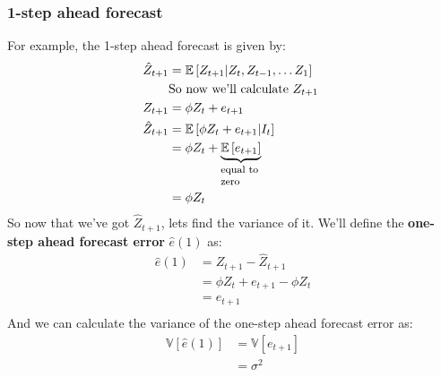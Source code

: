 \subsubsection{1-step ahead forecast}
For example, the 1-step ahead forecast is given by:
\begin{equation*}
    \begin{aligned}
        \hat{Z}_{t+1} &= \mathbb{E}\left[Z_{t+1} | Z_{t}, Z_{t-1}, \dots
        Z_{1}\right]  \\
                      &\text{So now we'll calculate $Z_{t+1}$ }\\
            Z_{t+1} &= \phi Z_{t} + e_{t+1} \\
        \hat{Z}_{t+1} &= \mathbb{E} \left[  \phi Z_{t} + e_{t+1} | I_{t}\right] \\
                      &= \phi Z_{t} +
                      \explain{\mathbb{E}\left[e_{t+1}\right]}{equal to zero}  \\
                      &= \phi Z_{t} \\
    \end{aligned}
\end{equation*}
So now that we've got  $ \hat{Z}_{t+1}$, lets find the variance of it. We'll
define the \textbf{one-step ahead forecast error} $ \hat{e}(1)$ as:
\begin{equation*}
    \begin{aligned}
        \hat{e}(1) &= Z_{t+1} - \hat{Z}_{t+1} \\
                   &= \phi Z_{t} + e_{t+1} - \phi Z_{t} \\
                   &= e_{t+1} \\
    \end{aligned}
\end{equation*}
And we can calculate the variance of the one-step ahead forecast error as:
\begin{equation*}
    \begin{aligned}
        \mathbb{V}\left[ \hat{e}(1)\right] &= \mathbb{V}\left[ e_{t+1} \right]
        \\
                                           &= \sigma^{2} \\
    \end{aligned}
\end{equation*}

